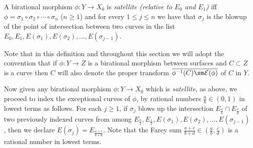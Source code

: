 \documentclass[11pt, final]{amsart}
\newcommand{\E}{\mathcal{E}}
\begin{document}

\begin{defn}
 A birational morphism $\phi : Y \to X_0$ is \emph{satellite (relative to $E_0$ and $E_1$)} iff $\phi = \sigma_1 \circ \sigma_2 \circ \cdots \circ \sigma_n$ ($n \ge 1$) and for every $1 \le j \le n$ we have that $\sigma_j$ is the blowup of the point of intersection between two curves in the list $E_0, E_1, E(\sigma_1), E(\sigma_2), \dots , E(\sigma_{j-1})$.
\end{defn}

Note that in this definition and throughout this section we will adopt the convention that if $\phi : Y \to Z$ is a birational morphism between surfaces and $C \subset Z$ is a curve then $C$ will also denote the proper transform $\overline{\phi^{-1}(C)\sm \E(\phi)}$ of $C$ in $Y$.

 Now given any birational morphism $\phi : Y \to X_0$ which is \emph{satellite}, as above, we proceed to index the exceptional curves of $\phi$, by rational numbers $\frac ab \in (0, 1)$ in lowest terms as follows. For each $j \ge 1$, %
if $\sigma_j$ blows up the intersection $E_{\frac ab} \cap E_{\frac cd}$ of two previously indexed curves from among $E_{\frac01}, E_{\frac11}, E(\sigma_1), E(\sigma_2), \dots , E(\sigma_{j-1})$, then we declare $E(\sigma_j) = E_{\frac{a+c}{b+d}}$. Note that the Farey sum $\frac{a+c}{b+d} \in (\frac ab, \frac cd)$ is a rational number in lowest terms.
\end{document}
